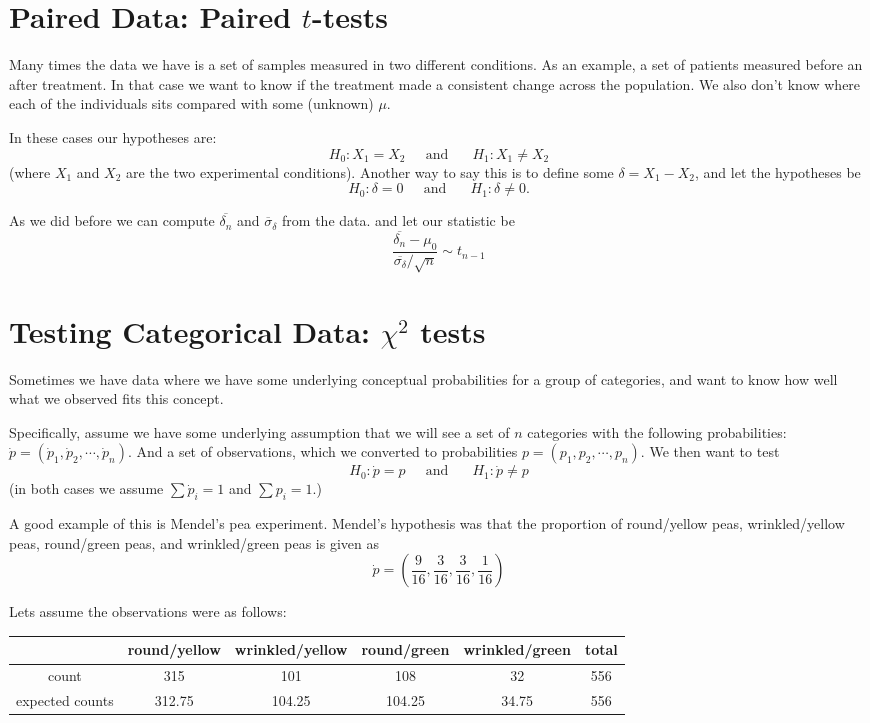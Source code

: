 \section{Paired Data: Paired $t$-tests}
Many times the data we have is a set of samples measured in two different conditions. 
As an example, a set of patients measured before an after treatment. 
In that case we want to know if the treatment made a consistent change across the population. 
We also don't know where each of the individuals sits compared with some (unknown) $\mu$. 

In these cases our hypotheses are: 
\[H_0: X_1 = X_2 \;\;\;\;\text{ and }\;\;\;\;\;H_1: X_1\ne X_2\]
(where $X_1$ and $X_2$ are the two experimental conditions). 
Another way to say this is to define some $\delta=X_1-X_2$, and let the hypotheses be 
\[H_0: \delta=0 \;\;\;\;\text{ and }\;\;\;\;\;H_1: \delta \ne 0.\]

As we did before we can compute $\overline{\delta_n}$ and $\overline{\sigma}_\delta$ from the data. 
and let our statistic be 
\[\frac{\overline{\delta_n}-\mu_0}{\overline{\sigma_\delta}/\sqrt{n}}\sim t_{n-1}\]


\section{Testing Categorical Data: $\chi^2$ tests}
Sometimes we have data where we have some underlying conceptual probabilities for a group of categories, 
and want to know how well what we observed fits this concept. 

Specifically, assume we have some underlying assumption that we will see a set of $n$ categories with the following probabilities:
$\dot{p} = (\dot{p}_1, \dot{p}_2, \cdots, \dot{p}_n)$. 
And a set of observations, which we converted to probabilities ${p} = ({p}_1, {p}_2, \cdots, {p}_n)$.
We then want to test  
\[H_0: \dot{p}=p \;\;\;\;\text{ and }\;\;\;\;\;H_1: \dot{p} \ne p\]
(in both cases we assume $\sum \dot{p}_i=1$ and $\sum p_i =1$.)

A good example of this is Mendel’s pea experiment. Mendel’s hypothesis was that the
proportion of round/yellow peas, wrinkled/yellow peas,
round/green peas, and wrinkled/green peas is given as
\[\dot{p} = \left(\frac{9}{16},\frac{3}{16},\frac{3}{16},\frac{1}{16}\right)\]

Lets assume the observations were as follows: 
\begin{center}
\begin{tabular}{|c|c|c|c|c||c|}
\hline
&round/yellow & wrinkled/yellow & round/green & wrinkled/green & total\\
\hline\hline
count & 315 & 101 & 108 & 32 & 556\\
expected counts& 312.75 & 104.25 & 104.25 & 34.75 & 556\\
\hline 
\end{tabular}
\end{center}

